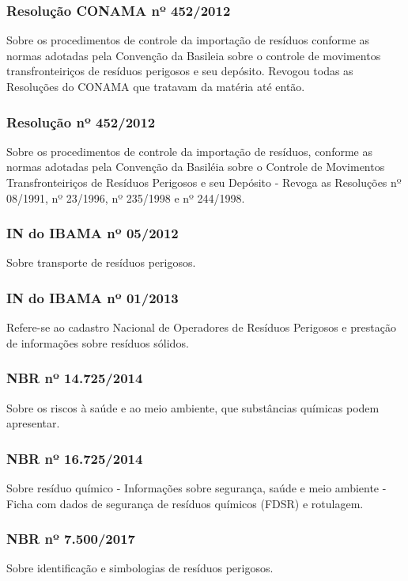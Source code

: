 \begin{subapend}
\begin{subsubapend}
		\subsubsection{Resolução CONAMA nº 452/2012}
		Sobre os procedimentos de controle da importação de resíduos conforme as normas adotadas pela Convenção da Basileia sobre o controle de movimentos transfronteiriços de resíduos perigosos e seu depósito. Revogou todas as Resoluções do CONAMA que tratavam da matéria até então.
	
		\subsubsection{Resolução nº 452/2012}
		Sobre os procedimentos de controle da importação de resíduos, conforme as normas adotadas pela Convenção da Basiléia sobre o Controle de Movimentos Transfronteiriços de Resíduos Perigosos e seu Depósito - Revoga as Resoluções nº 08/1991, nº 23/1996, nº 235/1998 e nº 244/1998.
	
		\subsubsection{IN do IBAMA nº 05/2012}
		Sobre transporte de resíduos perigosos.

		\subsubsection{IN do IBAMA nº 01/2013}
		Refere-se ao cadastro Nacional de Operadores de Resíduos Perigosos e prestação de informações sobre resíduos sólidos.
		
		\subsubsection{NBR nº 14.725/2014}
		Sobre os riscos à saúde e ao meio ambiente, que substâncias químicas podem apresentar.
		
		\subsubsection{NBR nº 16.725/2014}
		Sobre resíduo químico - Informações sobre segurança, saúde e meio ambiente - Ficha com dados de segurança de resíduos químicos (FDSR) e rotulagem.
		
		\subsubsection{NBR nº 7.500/2017}
		Sobre identificação e simbologias de resíduos perigosos.	
		

\end{subsubapend}
\end{subapend}
